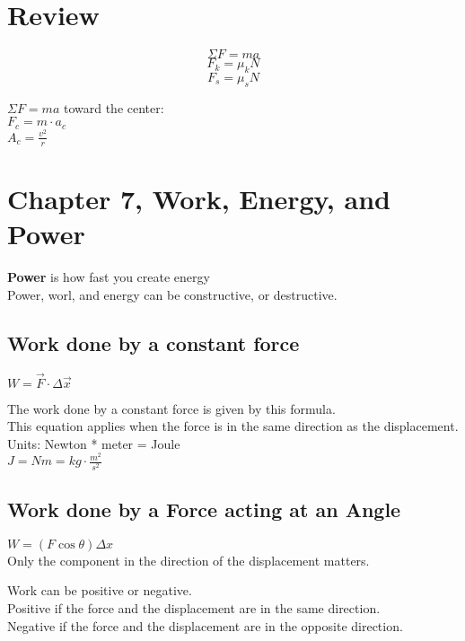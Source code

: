 \documentclass[]{article}
\date{}
\title{\docTitle}
\author{\docAuthor}
\date{\today}
\begin{document}
\maketitle
\section*{Review}
\begin{equation*}
    \Sigma F = ma
\end{equation*}
\begin{equation*}
    F_k=\mu_k N
\end{equation*}
\begin{equation*}
    F_s=\mu_s N
\end{equation*}

$\Sigma F=ma$ toward the center:\\
$F_c=m\cdot a_c$\\
$A_c=\frac{v^2}{r}$

\section*{Chapter 7, Work, Energy, and Power}
\textbf{Power} is how fast you create energy\\

Power, worl, and energy can be constructive, or destructive.

\subsection*{Work done by a constant force}
$W = \vec{F} \cdot \Delta \vec{x}$

The work done by a constant force is given by this formula.\\This equation applies when the force is in the same direction as the displacement.\\
Units: Newton * meter = Joule\\
$J = N m = kg \cdot \frac{m^2}{s^2}$

\subsection*{Work done by a Force acting at an Angle}
$W = (F \cos \theta)\Delta x$\\
Only the component in the direction of the displacement matters.


Work can be positive or negative.\\
Positive if the force and the displacement are in the same direction.\\
Negative if the force and the displacement are in the opposite direction.\\
\end{document}
